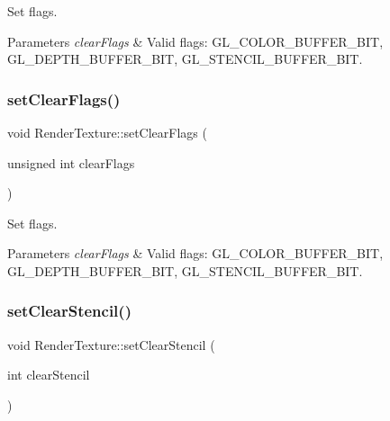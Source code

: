 Set flags.


\begin{DoxyParams}{Parameters}
{\em clear\+Flags} & Valid flags\+: G\+L\+\_\+\+C\+O\+L\+O\+R\+\_\+\+B\+U\+F\+F\+E\+R\+\_\+\+B\+IT, G\+L\+\_\+\+D\+E\+P\+T\+H\+\_\+\+B\+U\+F\+F\+E\+R\+\_\+\+B\+IT, G\+L\+\_\+\+S\+T\+E\+N\+C\+I\+L\+\_\+\+B\+U\+F\+F\+E\+R\+\_\+\+B\+IT. \\
\hline
\end{DoxyParams}
\mbox{\label{classRenderTexture_aa7614dfcc66334421283da912887eb42}} 
\subsubsection{\texorpdfstring{set\+Clear\+Flags()}{setClearFlags()}\hspace{0.1cm}{\footnotesize\ttfamily [2/2]}}
{\footnotesize\ttfamily void Render\+Texture\+::set\+Clear\+Flags (\begin{DoxyParamCaption}\item[{unsigned int}]{clear\+Flags }\end{DoxyParamCaption})\hspace{0.3cm}{\ttfamily [inline]}}

Set flags.


\begin{DoxyParams}{Parameters}
{\em clear\+Flags} & Valid flags\+: G\+L\+\_\+\+C\+O\+L\+O\+R\+\_\+\+B\+U\+F\+F\+E\+R\+\_\+\+B\+IT, G\+L\+\_\+\+D\+E\+P\+T\+H\+\_\+\+B\+U\+F\+F\+E\+R\+\_\+\+B\+IT, G\+L\+\_\+\+S\+T\+E\+N\+C\+I\+L\+\_\+\+B\+U\+F\+F\+E\+R\+\_\+\+B\+IT. \\
\hline
\end{DoxyParams}
\mbox{\label{classRenderTexture_a56dca402afad6762c5fe3c91dae32d8b}} 
\subsubsection{\texorpdfstring{set\+Clear\+Stencil()}{setClearStencil()}\hspace{0.1cm}{\footnotesize\ttfamily [1/2]}}
{\footnotesize\ttfamily void Render\+Texture\+::set\+Clear\+Stencil (\begin{DoxyParamCaption}\item[{int}]{clear\+Stencil }\end{DoxyParamCaption})\hspace{0.3cm}{\ttfamily [inline]}}

